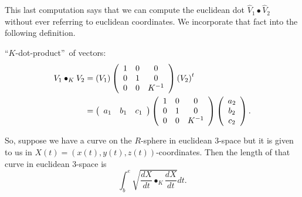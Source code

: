 \documentclass{ximera}
\begin{document}
This last computation says that we can compute the euclidean dot $\hat{V}%
_{1}\bullet\hat{V}_{2}$ without ever referring to euclidean coordinates. We
incorporate that fact into the following definition.

\begin{definition}
\textquotedblleft$K$-dot-product\textquotedblright\ of vectors:%
\begin{align}
V_{1}\bullet_{K}V_{2}  &  =\left(  V_{1}\right)  \left(
\begin{array}
[c]{ccc}%
1 & 0 & 0\\
0 & 1 & 0\\
0 & 0 & K^{-1}%
\end{array}
\right)  \left(  V_{2}\right)  ^{t}\label{10}\\
&  =\left(
\begin{array}
[c]{ccc}%
a_{1} & b_{1} & c_{1}%
\end{array}
\right)  \left(
\begin{array}
[c]{ccc}%
1 & 0 & 0\\
0 & 1 & 0\\
0 & 0 & K^{-1}%
\end{array}
\right)  \left(
\begin{array}
[c]{c}%
a_{2}\\
b_{2}\\
c_{2}%
\end{array}
\right)  .\nonumber
\end{align}

\end{definition}

So, suppose we have a curve on the $R$-sphere in euclidean $3$-space but it is
given to us in $X\left(  t\right)  =\left(  x\left(  t\right)  ,y\left(
t\right)  ,z\left(  t\right)  \right)  $-coordinates. Then the length of that
curve in euclidean $3$-space is%
\[%
{\displaystyle\int\nolimits_{b}^{e}}
\sqrt{\frac{dX}{dt}\bullet_{K}\frac{dX}{dt}}dt.
\]
\end{document}
